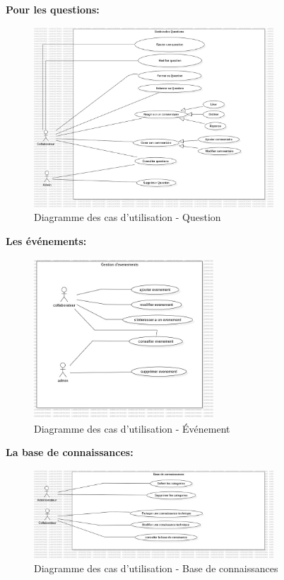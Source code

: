 \documentclass{article}
\begin{document}
                \textbf{Pour les questions:}
                \begin{figure}[h!]
                    \centering
                    \includegraphics[width=0.8\textwidth]{assets/diagrammes/jpg/Model1!useCaseQuestion_0.jpg}
                    \caption{Diagramme des cas d'utilisation - Question}
                \end{figure}
                
                \FloatBarrier
                
                \textbf{Les événements:}
                \begin{figure}[h!]
                    \centering
                    \includegraphics[width=0.6\textwidth]{assets/diagrammes/jpg/Model2!UseCaseEvent_1.jpg}
                    \caption{Diagramme des cas d'utilisation - Événement}
                \end{figure}
                
                \FloatBarrier
                \newpage
                \textbf{La base de connaissances:}
                \begin{figure}[h!]
                    \centering
                    \includegraphics[width=0.8\textwidth]{assets/diagrammes/jpg/Model3!UseCaseDoc_2.jpg}
                    \caption{Diagramme des cas d'utilisation - Base de connaissances}
                \end{figure}
                
\end{document}
